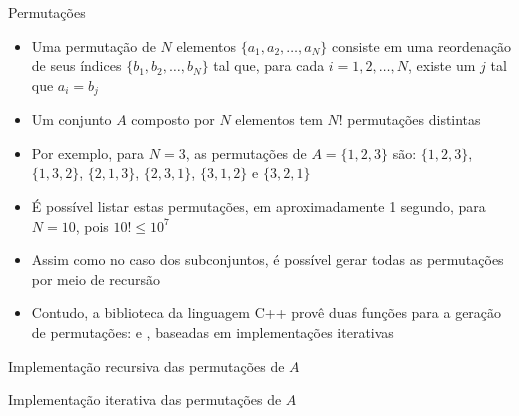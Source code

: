 \begin{frame}[fragile]{Permutações}

    \begin{itemize}
        \item Uma permutação de $N$ elementos $\lbrace a_1, a_2, \ldots, a_N\rbrace$ consiste
            em uma reordenação de seus índices $\lbrace b_1, b_2, \ldots, b_N\rbrace$ tal que,
            para cada $i = 1, 2, \ldots, N$, existe um $j$ tal que $a_i = b_j$

        \item Um conjunto $A$ composto por $N$ elementos tem $N!$ permutações distintas

        \item Por exemplo, para $N = 3$, as permutações de $A = \lbrace 1, 2, 3\rbrace$ são:
            $\lbrace 1, 2, 3\rbrace$, $\lbrace 1, 3, 2\rbrace$, $\lbrace 2, 1, 3\rbrace$,
            $\lbrace 2, 3, 1\rbrace$, $\lbrace 3, 1, 2\rbrace$ e $\lbrace 3, 2, 1\rbrace$

        \item É possível listar estas permutações, em aproximadamente 1 segundo, para
            $N = 10$, pois $10! \leq 10^7$

        \item Assim como no caso dos subconjuntos, é possível gerar todas as permutações por
            meio de recursão
        
        \item Contudo, a biblioteca  da linguagem C++ provê duas funções
            para a geração de permutações:  e
            , baseadas em implementações iterativas
    \end{itemize}

\end{frame}

\begin{frame}[fragile]{Implementação recursiva das permutações de $A$}
\end{frame}

\begin{frame}[fragile]{Implementação iterativa das permutações de $A$}
\end{frame}


